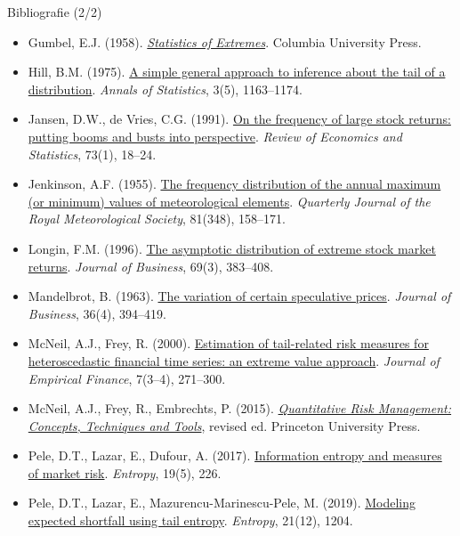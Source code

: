 \begin{frame}{Bibliografie (2/2)}
\itemsize{\tiny}
\begin{itemize}
    \item Gumbel, E.J. (1958). \href{https://doi.org/10.7312/gumb92958}{\textit{Statistics of Extremes}}. Columbia University Press.
    \item Hill, B.M. (1975). \href{https://doi.org/10.1214/aos/1176343247}{A simple general approach to inference about the tail of a distribution}. \textit{Annals of Statistics}, 3(5), 1163--1174.
    \item Jansen, D.W., de Vries, C.G. (1991). \href{https://doi.org/10.2307/2109682}{On the frequency of large stock returns: putting booms and busts into perspective}. \textit{Review of Economics and Statistics}, 73(1), 18--24.
    \item Jenkinson, A.F. (1955). \href{https://doi.org/10.1002/qj.49708134804}{The frequency distribution of the annual maximum (or minimum) values of meteorological elements}. \textit{Quarterly Journal of the Royal Meteorological Society}, 81(348), 158--171.
    \item Longin, F.M. (1996). \href{https://doi.org/10.1086/209695}{The asymptotic distribution of extreme stock market returns}. \textit{Journal of Business}, 69(3), 383--408.
    \item Mandelbrot, B. (1963). \href{https://doi.org/10.1086/294632}{The variation of certain speculative prices}. \textit{Journal of Business}, 36(4), 394--419.
    \item McNeil, A.J., Frey, R. (2000). \href{https://doi.org/10.1016/S0927-5398(00)00012-8}{Estimation of tail-related risk measures for heteroscedastic financial time series: an extreme value approach}. \textit{Journal of Empirical Finance}, 7(3--4), 271--300.
    \item McNeil, A.J., Frey, R., Embrechts, P. (2015). \href{https://press.princeton.edu/books/hardcover/9780691166278/quantitative-risk-management}{\textit{Quantitative Risk Management: Concepts, Techniques and Tools}}, revised ed. Princeton University Press.
    \item Pele, D.T., Lazar, E., Dufour, A. (2017). \href{https://doi.org/10.3390/e19050226}{Information entropy and measures of market risk}. \textit{Entropy}, 19(5), 226.
    \item Pele, D.T., Lazar, E., Mazurencu-Marinescu-Pele, M. (2019). \href{https://doi.org/10.3390/e21121204}{Modeling expected shortfall using tail entropy}. \textit{Entropy}, 21(12), 1204.

\end{itemize}
\end{frame}
